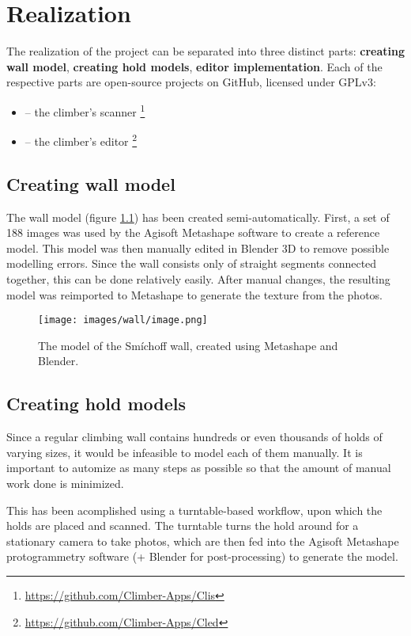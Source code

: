 \chapter{Realization}

The realization of the project can be separated into three distinct parts: \textbf{creating wall model}, \textbf{creating hold models}, \textbf{editor implementation}.
Each of the respective parts are open-source projects on GitHub, licensed under GPLv3:
\begin{itemize}
	\item \raisebox{-0.08em}{} -- the climber's scanner \footnote{\url{https://github.com/Climber-Apps/Clis}}
	\item \raisebox{-0.08em}{} -- the climber's editor \footnote{\url{https://github.com/Climber-Apps/Cled}}
\end{itemize}

\section{Creating wall model}
The wall model (figure \ref{fig:model}) has been created semi-automatically.
First, a set of 188 images was used by the Agisoft Metashape software to create a reference model.
This model was then manually edited in Blender 3D to remove possible modelling errors.
Since the wall consists only of straight segments connected together, this can be done relatively easily.
After manual changes, the resulting model was reimported to Metashape to generate the texture from the photos.

\begin{figure}
	\centering
	\texttt{[image: images/wall/image.png]}
	\caption{The model of the Smíchoff wall, created using Metashape and Blender.}
	\label{fig:model}
\end{figure}


\section{Creating hold models}
Since a regular climbing wall contains hundreds or even thousands of holds of varying sizes, it would be infeasible to model each of them manually.
It is important to automize as many steps as possible so that the amount of manual work done is minimized.

This has been acomplished using a turntable-based workflow, upon which the holds are placed and scanned.
The turntable turns the hold around for a stationary camera to take photos, which are then fed into the Agisoft Metashape protogrammetry software (+ Blender for post-processing) to generate the model.

